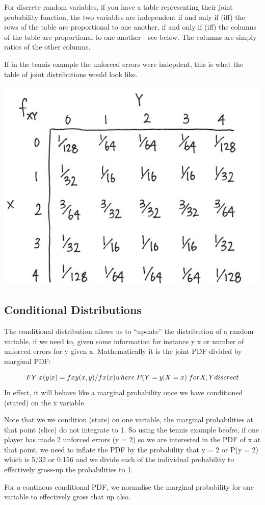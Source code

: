 \documentclass[]{book}
\theoremstyle{definition}
\theoremstyle{definition}
\theoremstyle{definition}
\theoremstyle{remark}
\begin{document}
For discrete random variables, if you have a table representing their
joint probability function, the two variables are independent if and
only if (iff) the rows of the table are proportional to one another, if
and only if (iff) the columns of the table are proportional to one
another - see below. The columns are simply ratios of the other columns.

If in the tennis example the unforced errors were indepdent, this is
what the table of joint distributions would look like.

\includegraphics[width=1\linewidth]{images/indepdentrvs}

\subsection{Conditional Distributions}\label{conditional-distributions}

The conditional distribution allows us to ``update'' the distribution of
a random variable, if we need to, given some information for instance y
\textbar{} x or number of unforced errors for y given x. Mathematically
it is the joint PDF divided by marginal PDF:

\[FY|x (y|x) = fxy(x,y) / fx(x) \\ where \; P(Y=y |X=x) \; for X,Y discreet\]
In effect, it will behave like a marginal probability once we have
conditioned (stated) on the x variable.

Note that we we condition (state) on one variable, the marginal
probabilities at that point (slice) do not integrate to 1. So using the
tennis example beofre, if one player has made 2 unforced errors (y = 2)
so we are interested in the PDF of x at that point, we need to inflate
the PDF by the probability that y = 2 or P(y = 2) which is 5/32 or 0.156
and we divide each of the individual probability to effectively gross-up
the probabilities to 1.

For a continous conditional PDF, we normalise the marginal probability
for one variable to effectively gross that up also.


\end{document}
